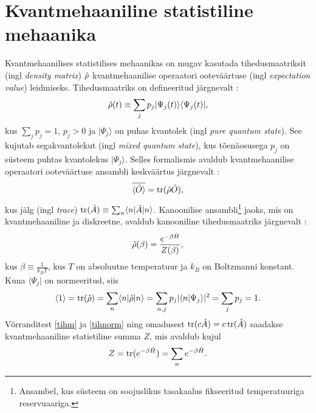 \documentclass{trkut}%
\DeclareMathOperator{\tr}{tr}
\renewcommand\bra[1]{{\langle{#1}|}}
\renewcommand\ket[1]{{|{#1}\rangle}}
\renewcommand\braket[1]{\langle{#1}\rangle}
\begin{document}
\section{Kvantmehaaniline statistiline mehaanika}

Kvantmehaanilises statistilises mehaanikas on mugav kasutada tihedusmaatriksit (ingl \textit{density matrix}) $\op{\rho}$ kvantmehaanilise operaatori ooteväärtuse (ingl \textit{expectation value}) leidmiseks.
Tihedusmaatriks on defineeritud järgnevalt \parencite[172]{kardar07}:
\begin{equation}
    \op{\rho}(t) \equiv \sum_j p_j \ket{\Psi_j(t)} \bra{\Psi_j(t)},
\end{equation}
kus $\sum_j p_j=1$, $p_j > 0$ ja $\ket{\Psi_j}$ on puhas kvantolek (ingl \textit{pure quantum state}).
See kujutab segakvantolekut (ingl \textit{mixed quantum state}), kus tõenäosusega $p_j$ on süsteem puhtas kvantolekus $\ket{\Psi_j}$.
Selles formalismis avaldub kvantmehaanilise operaatori ooteväärtuse ansambli keskväärtus järgnevalt \parencite[172]{kardar07}:
\begin{equation}
    \overline{\braket{\op{O}}}=\tr(\op{\rho}\op{O}),
    \label{ootev}
\end{equation}
kus jälg (ingl \textit{trace}) $\tr(\op{A}) \equiv \sum_n \braket{n|\op{A}|n}$. %
Kanoonilise ansambli\footnote{Ansambel, kus süsteem on soojuslikus tasakaalus fikseeritud temperatuuriga reservuaariga.} jaoks, mis on kvantmehaaniline ja diskreetne, avaldub kanooniline tihedusmaatriks järgnevalt \parencite[174]{kardar07}:
\begin{equation}
    \op{\rho}(\beta) = \frac{e^{-\beta \op{H}}}{Z(\beta)},
    \label{tihm}
\end{equation}
kus $\beta \equiv \frac{1}{k_B T}$, kus $T$ on absoluutne temperatuur ja $k_B$ on Boltzmanni konstant.
Kuna $\bra{\Psi_j}$ on normeeritud, siis
\begin{equation}
    \braket{1}=\tr(\op{\rho})=\sum_n \braket{n|\op{\rho}|n}=\sum_{n, j} p_j |\braket{n| \Psi_j}|^2=\sum_j p_j=1.
    \label{tihnorm}
\end{equation}
Võrranditest \eqref{tihm} ja \eqref{tihnorm} ning omadusest $\tr(c\op{A})=c\tr(\op{A})$ saadakse kvantmehaaniline statistiline summa $Z$, mis avaldub kujul
\begin{equation}
    Z=\tr(e^{-\beta \op{H}})=\sum_n e^{-\beta \op{H}}.
    \label{part}
\end{equation}
\end{document}
